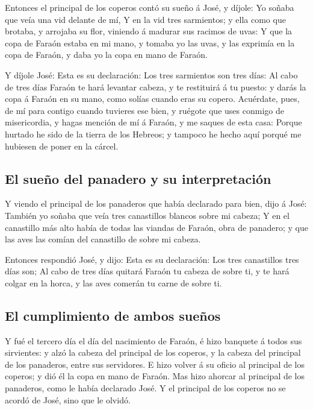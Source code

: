  Entonces el principal de los coperos contó su sueño á José,
y díjole: Yo soñaba que veía una vid delante de mí,  Y en
la vid tres sarmientos; y ella como que brotaba, y arrojaba su flor,
viniendo á madurar sus racimos de uvas:  Y que la copa de
Faraón estaba en mi mano, y tomaba yo las uvas, y las exprimía en la
copa de Faraón, y daba yo la copa en mano de Faraón.

 Y díjole José: Esta es su declaración: Los tres sarmientos
son tres días:  Al cabo de tres días Faraón te hará
levantar cabeza, y te restituirá á tu puesto: y darás la copa á Faraón
en su mano, como solías cuando eras su copero.  Acuérdate,
pues, de mí para contigo cuando tuvieres ese bien, y ruégote que uses
conmigo de misericordia, y hagas mención de mí á Faraón, y me saques de
esta casa:  Porque hurtado he sido de la tierra de los
Hebreos; y tampoco he hecho aquí porqué me hubiesen de poner en la
cárcel.

\hypertarget{el-sueuxf1o-del-panadero-y-su-interpretaciuxf3n}{%
\subsection{El sueño del panadero y su
interpretación}\label{el-sueuxf1o-del-panadero-y-su-interpretaciuxf3n}}

 Y viendo el principal de los panaderos que había declarado
para bien, dijo á José: También yo soñaba que veía tres canastillos
blancos sobre mi cabeza;  Y en el canastillo más alto había
de todas las viandas de Faraón, obra de panadero; y que las aves las
comían del canastillo de sobre mi cabeza.

 Entonces respondió José, y dijo: Esta es su declaración:
Los tres canastillos tres días son;  Al cabo de tres días
quitará Faraón tu cabeza de sobre ti, y te hará colgar en la horca, y
las aves comerán tu carne de sobre ti.

\hypertarget{el-cumplimiento-de-ambos-sueuxf1os}{%
\subsection{El cumplimiento de ambos
sueños}\label{el-cumplimiento-de-ambos-sueuxf1os}}

 Y fué el tercero día el día del nacimiento de Faraón, é
hizo banquete á todos sus sirvientes: y alzó la cabeza del principal de
los coperos, y la cabeza del principal de los panaderos, entre sus
servidores.  E hizo volver á su oficio al principal de los
coperos; y dió él la copa en mano de Faraón.  Mas hizo
ahorcar al principal de los panaderos, como le había declarado José.
 Y el principal de los coperos no se acordó de José, sino
que le olvidó.

